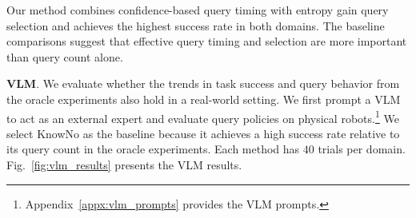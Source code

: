 Our method combines confidence-based query timing with entropy gain query selection and achieves the highest success rate in both domains. The baseline comparisons suggest that effective query timing and selection are more important than query count alone.

\vspace{10pt}
\noindent\textbf{VLM}\label{exp:vlm_eval}. We evaluate whether the trends in task success and query behavior from the oracle experiments also hold in a real-world setting. We first prompt a VLM to act as an external expert and evaluate query policies on physical robots.\footnote{Appendix~\ref{appx:vlm_prompts} provides the VLM prompts.} We select KnowNo as the baseline because it achieves a high success rate relative to its query count in the oracle experiments. Each method has $40$ trials per domain. Fig.~\ref{fig:vlm_results} presents the VLM results.

